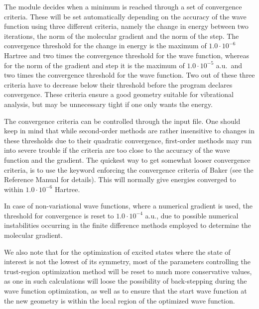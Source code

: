 The  module decides when a minimum is reached through a
set of convergence criteria. These will be
set automatically depending on the accuracy of the wave function
using three different criteria, namely the change in energy
between two iterations, the norm of the molecular
gradient and the norm of the
step. The convergence threshold for the change
in energy is the maximum of $1.0\cdot 10^{-6}$ Hartree and two times the
convergence threshold for the wave function, whereas for the norm of
the gradient and step it is the maximum of $1.0\cdot 10^{-5}$ a.u.\ and
two times the 
convergence threshold for the wave function. Two out of these
three criteria have to decrease below their threshold before the program
declares convergence. These criteria ensure a good geometry
suitable for vibrational analysis, but may be unnecessary tight if
one only wants the energy.

The convergence criteria can be controlled through the input file. One
should keep in mind that while second-order methods are rather
insensitive to changes in these thresholds due to their quadratic
convergence, first-order methods may run into severe trouble if the
criteria are too close to the accuracy of the wave function and the
gradient. The quickest way to get somewhat looser convergence
criteria, is to use the keyword  enforcing the convergence
criteria of Baker\cite{Baker} (see the Reference Manual for
details). This will normally give energies converged to within
$1.0\cdot 10^{-6}$ Hartree.

In case of non-variational
wave functions, where a numerical 
gradient is used, the threshold for
convergence is reset to 
$1.0\cdot 10^{-4}$ a.u., due to possible numerical
instabilities occurring in the 
finite difference methods employed to
determine the molecular gradient.

We also note that for the optimization of excited
states
where the state of interest is not the lowest of its
symmetry, most of the parameters controlling the trust-region
optimization method will be reset to much more conservative
values, as one in such calculations will loose the possibility of
back-stepping during the wave function optimization, as well as
to ensure that the start wave function at the new geometry
is within the local region of the optimized wave function.

